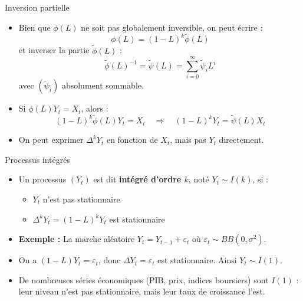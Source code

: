 \documentclass[11pt,aspectratio=169]{beamer}
\begin{document}
\begin{frame}{Inversion partielle}

\begin{itemize}

\item Bien que $\phi(L)$ ne soit pas globalement inversible, on peut écrire :
  \[
  \phi(L) = (1-L)^k \tilde{\phi}(L)
  \]
  et inverser la partie $\tilde{\phi}(L)$ :
  \[
  \tilde{\phi}(L)^{-1} = \tilde{\psi}(L) = \sum_{i=0}^{\infty} \tilde{\psi}_i L^i
  \]
  avec $(\tilde{\psi}_i)$ absolument sommable.\newline

\item Si $\phi(L) Y_t = X_t$, alors :
  \[
  (1-L)^k \tilde{\phi}(L) Y_t = X_t \quad \Rightarrow \quad (1-L)^k Y_t = \tilde{\psi}(L) X_t
  \]\newline

\item On peut exprimer $\Delta^k Y_t$ en fonction de $X_t$, mais pas $Y_t$ directement.

\end{itemize}

\end{frame}

\begin{frame}{Processus intégrés}

\begin{itemize}

\item Un processus $(Y_t)$ est dit \textbf{intégré d'ordre $k$}, noté $Y_t \sim I(k)$, si :
  \begin{itemize}
    \item $Y_t$ n'est pas stationnaire\newline
    \item $\Delta^k Y_t = (1-L)^k Y_t$ est stationnaire
  \end{itemize}

\item \textbf{Exemple :} La marche aléatoire $Y_t = Y_{t-1} + \varepsilon_t$ où $\varepsilon_t \sim BB(0,\sigma^2)$.\newline

\item On a $(1-L)Y_t = \varepsilon_t$, donc $\Delta Y_t = \varepsilon_t$ est stationnaire. Ainsi $Y_t \sim I(1)$.\newline

\item De nombreuses séries économiques (PIB, prix, indices boursiers) sont $I(1)$ : leur niveau n'est pas stationnaire, mais leur taux de croissance l'est.

\end{itemize}

\end{frame}
\end{document}
